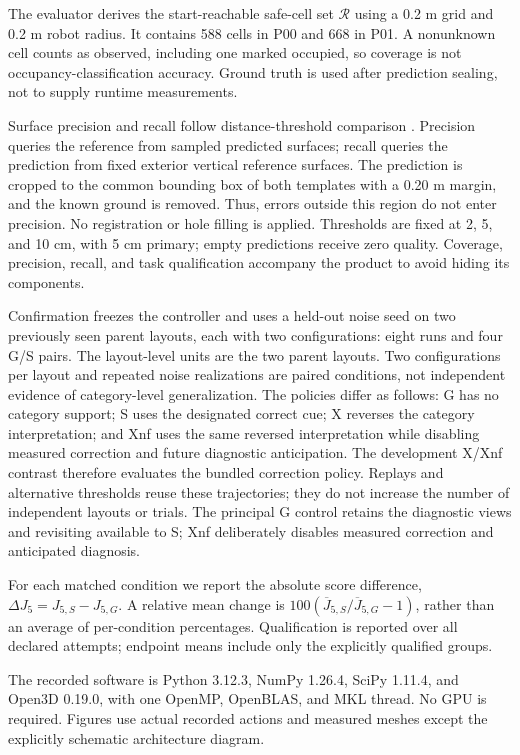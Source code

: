 \documentclass[11pt,a4paper]{article}
\begin{document}
The evaluator derives the start-reachable safe-cell set \(\mathcal R\) using a 0.2 m grid and 0.2 m robot radius. It contains 588 cells in P00 and 668 in P01. A nonunknown cell counts as observed, including one marked occupied, so coverage is not occupancy-classification accuracy. Ground truth is used after prediction sealing, not to supply runtime measurements.

Surface precision and recall follow distance-threshold comparison \cite{ref14}. Precision queries the reference from sampled predicted surfaces; recall queries the prediction from fixed exterior vertical reference surfaces. The prediction is cropped to the common bounding box of both templates with a 0.20 m margin, and the known ground is removed. Thus, errors outside this region do not enter precision. No registration or hole filling is applied. Thresholds are fixed at 2, 5, and 10 cm, with 5 cm primary; empty predictions receive zero quality. Coverage, precision, recall, and task qualification accompany the product to avoid hiding its components.

Confirmation freezes the controller and uses a held-out noise seed on two previously seen parent layouts, each with two configurations: eight runs and four G/S pairs. The layout-level units are the two parent layouts. Two configurations per layout and repeated noise realizations are paired conditions, not independent evidence of category-level generalization. The policies differ as follows: G has no category support; S uses the designated correct cue; X reverses the category interpretation; and Xnf uses the same reversed interpretation while disabling measured correction and future diagnostic anticipation. The development X/Xnf contrast therefore evaluates the bundled correction policy. Replays and alternative thresholds reuse these trajectories; they do not increase the number of independent layouts or trials. The principal G control retains the diagnostic views and revisiting available to S; Xnf deliberately disables measured correction and anticipated diagnosis.

For each matched condition we report the absolute score difference, \(\Delta J_5=J_{5,S}-J_{5,G}\). A relative mean change is \(100(\overline J_{5,S}/\overline J_{5,G}-1)\), rather than an average of per-condition percentages. Qualification is reported over all declared attempts; endpoint means include only the explicitly qualified groups.

The recorded software is Python 3.12.3, NumPy 1.26.4, SciPy 1.11.4, and Open3D 0.19.0, with one OpenMP, OpenBLAS, and MKL thread. No GPU is required. Figures use actual recorded actions and measured meshes except the explicitly schematic architecture diagram.
\end{document}
